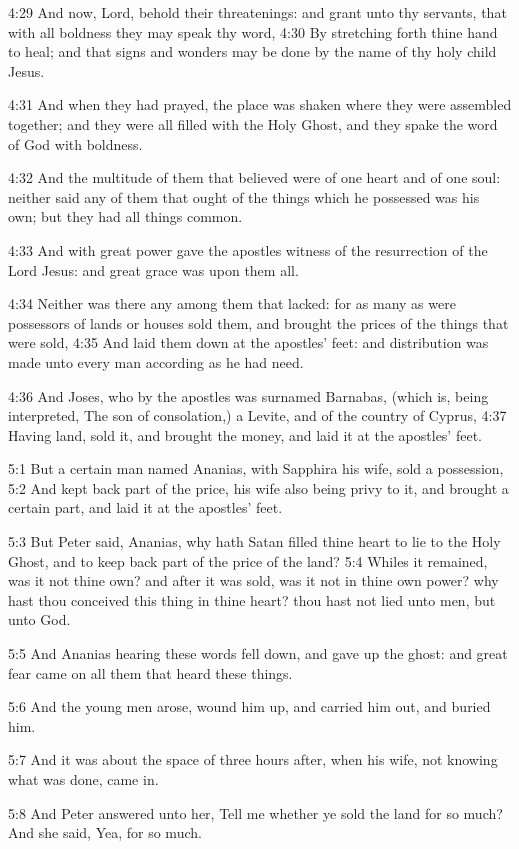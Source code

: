 4:29 And now, Lord, behold their threatenings: and grant unto thy servants, that with all boldness they may speak thy word, 4:30 By stretching forth thine hand to heal; and that signs and wonders may be done by the name of thy holy child Jesus.

4:31 And when they had prayed, the place was shaken where they were assembled together; and they were all filled with the Holy Ghost, and they spake the word of God with boldness.

4:32 And the multitude of them that believed were of one heart and of one soul: neither said any of them that ought of the things which he possessed was his own; but they had all things common.

4:33 And with great power gave the apostles witness of the resurrection of the Lord Jesus: and great grace was upon them all.

4:34 Neither was there any among them that lacked: for as many as were possessors of lands or houses sold them, and brought the prices of the things that were sold, 4:35 And laid them down at the apostles' feet: and distribution was made unto every man according as he had need.

4:36 And Joses, who by the apostles was surnamed Barnabas, (which is, being interpreted, The son of consolation,) a Levite, and of the country of Cyprus, 4:37 Having land, sold it, and brought the money, and laid it at the apostles' feet.

5:1 But a certain man named Ananias, with Sapphira his wife, sold a possession, 5:2 And kept back part of the price, his wife also being privy to it, and brought a certain part, and laid it at the apostles' feet.

5:3 But Peter said, Ananias, why hath Satan filled thine heart to lie to the Holy Ghost, and to keep back part of the price of the land?  5:4 Whiles it remained, was it not thine own? and after it was sold, was it not in thine own power? why hast thou conceived this thing in thine heart?  thou hast not lied unto men, but unto God.

5:5 And Ananias hearing these words fell down, and gave up the ghost: and great fear came on all them that heard these things.

5:6 And the young men arose, wound him up, and carried him out, and buried him.

5:7 And it was about the space of three hours after, when his wife, not knowing what was done, came in.

5:8 And Peter answered unto her, Tell me whether ye sold the land for so much? And she said, Yea, for so much.

